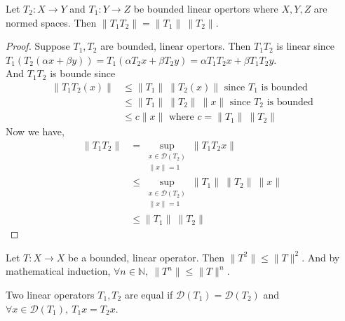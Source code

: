 \begin{remark}
	Let $T_2 : X \to Y$ and $T_1 : Y \to Z$ be bounded linear opertors where $X,Y,Z$ are normed spaces.
	Then $\|T_1T_2\| = \|T_1\| \ \|T_2\|$.
\end{remark}
\begin{proof}
	Suppose $T_1,T_2$ are bounded, linear opertors.
	Then $T_1T_2$ is linear since $T_1(T_2(\alpha x + \beta y)) = T_1(\alpha T_2x + \beta T_2y) = \alpha T_1T_2x + \beta T_1T_2y$.\\

	And $T_1T_2$ is bounde since
	\begin{align*}
		\|T_1T_2(x)\| 
		& \le \|T_1\| \ \|T_2(x)\| \text{ since $T_1$ is bounded} \\
		& \le \|T_1\| \ \|T_2\| \ \|x\| \text{ since $T_2$ is bounded} \\
		& \le c \|x\| \text{ where $c = \|T_1\|\ \|T_2\|$}
	\end{align*}
	Now we have,
	\begin{align*}
		\|T_1T_2\|
		& = \sup_{\substack{x \in \mathscr{D}(T_2) \\ \|x\| = 1}} \|T_1T_2x\| \\
		& \le \sup_{\substack{x \in \mathscr{D}(T_2) \\ \|x\| = 1}} \|T_1\| \ \|T_2\| \ \|x\| \\
		& \le \|T_1\| \ \|T_2\|
	\end{align*}
\end{proof}

\begin{remark}
	Let $T : X \to X$ be a bounded, linear operator.
	Then $\|T^2\| \le \|T\|^2$.
	And by mathematical induction, $\forall n \in \mathbb{N},\ \|T^n\| \le \|T\|^n$.
\end{remark}

\begin{definition}
	Two linear operators $T_1,T_2$ are equal if $\mathscr{D}(T_1) = \mathscr{D}(T_2)$ and $\forall x \in \mathscr{D}(T_1),\ T_1x = T_2x$.
\end{definition}


